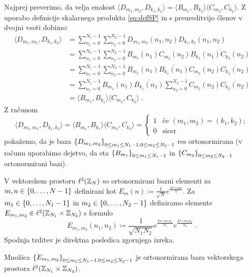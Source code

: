 \begin{dokaz}
Najprej preverimo, da velja enakost $\langle D_{m_1, m_2}, D_{k_1, k_2}\rangle = \langle B_{m_1}, B_{k_1} \rangle \langle C_{m_2}, C_{k_2}\rangle$. Z uporabo definicije skalarnega produkta \eqref{eq:defSP} in s preureditvijo členov v dvojni vsoti dobimo:
%
\begin{align*}
\langle D_{m_1, m_2}, D_{k_1, k_2}\rangle & = \sum_{n_1 = 0}^{N_1 - 1} \sum_{n_2 = 0}^{N_2 - 1} D_{m_1, m_2}(n_1, n_2)\overline{D_{k_1, k_2}(n_1, n_2)} \\
& = \sum_{n_1 = 0}^{N_1 - 1} \sum_{n_2 = 0}^{N_2 - 1} B_{m_1}(n_1)C_{m_2}(n_2) \overline{B_{k_1}(n_1)C_{k_2}(n_2)} \\
& = \sum_{n_1 = 0}^{N_1 - 1} \sum_{n_2 = 0}^{N_2 - 1} B_{m_1}(n_1)\overline{B_{k_1}(n_1)}C_{m_2}(n_2) \overline{C_{k_2}(n_2)} \\
& = \sum_{n_1 = 0}^{N_1 - 1} B_{m_1}(n_1)\overline{B_{k_1}(n_1)} \sum_{n_2 = 0}^{N_2 - 1} C_{m_2}(n_2) \overline{C_{k_2}(n_2)} \\
& = \langle B_{m_1}, B_{k_1} \rangle \langle C_{m_2}, C_{k_2}\rangle \;.
\end{align*}
%
Z računom
$$\langle D_{m_1, m_2}, D_{k_1, k_2}\rangle = \langle B_{m_1}, B_{k_1} \rangle \langle C_{m_2}, C_{k_2}\rangle =
\begin{cases}
1 & \mbox{če } (m_1, m_2) = (k_1, k_2); \\
0 & \mbox{sicer}
\end{cases}
$$
pokažemo, da je baza $\left\{D_{m_1, m_2}\right\}_{0 \leq m_1 \leq N_1 - 1, 0 \leq m_2 \leq N_2 - 1}$ res ortonormirana (v računu uporabimo dejstvo, da sta $\left\{B_{m_1}\right\}_{0 \leq m_1 \leq N_1-1}$ in $\left\{C_{m_2}\right\}_{0 \leq m_2 \leq N_2-1}$ ortonormirani bazi).
%
\end{dokaz}
%
V vektorskem prostoru $\ell^2(\mathbb Z_N)$ so ortonormirani bazni elementi za $m,n \in \left\{0, \ldots, N-1\right\}$ definirani kot
$E_m(n) \coloneqq \frac{1}{\sqrt{N}} e^{\frac{2\pi \imath mn}{N}}$.
Za $m_1 \in \left\{0, \ldots, N_1-1\right\}$ in $m_2 \in \left\{0, \ldots, N_2-1\right\}$ definiramo elemente $E_{m_1, m_2} \in \ell^2(\mathbb Z_{N_1} \times \mathbb Z_{N_2})$ s formulo
$$E_{m_1, m_2}(n_1, n_2) \coloneqq \frac{1}{\sqrt{N_1N_2}} e^{\frac{2\pi \imath m_1n_1}{N_1}} e^{\frac{2\pi \imath m_2n_2}{N_2}} \;.$$
Spodnja trditev je direktna posledica zgornjega izreka.
%
\begin{trditev}
Množica $\left\{E_{m_1, m_2}\right\}_{0 \leq m_1 \leq N_1-1, 0 \leq m_2 \leq N_2-1}$ je ortonormirana baza vek\-tor\-ske\-ga prostora $\ell^2(\mathbb Z_{N_1} \times \mathbb Z_{N_2})$.
\end{trditev}

